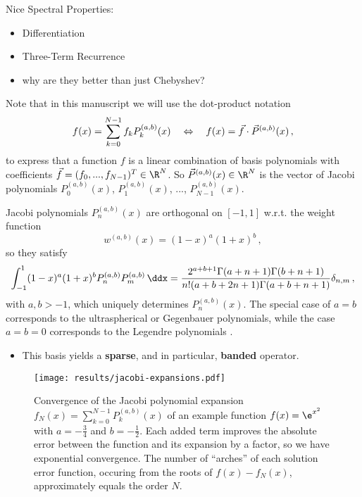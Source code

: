 Nice Spectral Properties:
\begin{itemize}
  \item Differentiation
  \item Three-Term Recurrence
  \item why are they better than just Chebyshev?
\end{itemize}

Note that in this manuscript we will use the dot-product notation
$$f(x) = \sum_{k=0}^{N-1} f_k P_k^{(a, b)}(x) \quad\Leftrightarrow\quad f(x) = \vec{f} \cdot \vec{P}^{(a, b)}(x)\,,$$
to express that a function $f$ is a linear combination of basis polynomials with coefficients $\vec{f} = (f_0, ..., f_{N-1})^T \in \R^N$.
So $\vec{P}^{(a, b)}(x) \in \R^N$ is the vector of Jacobi polynomials $P^{(a, b)}_0(x)$, $P^{(a, b)}_1(x)$, ..., $P^{(a, b)}_{N-1}(x)$.

Jacobi polynomials $P_n^{(a,b)}(x)$ are orthogonal on $[-1,1]$ w.r.t. the weight function
\begin{equation*}
  w^{(a,b)}(x)=(1-x)^a (1+x)^b\,,
\end{equation*}
so they satisfy
\begin{align}
  \int_{-1}^1(1-x)^a(1+x)^bP_n^{(a,b)}P_m^{(a,b)}\,\ddx = \frac{2^{a+b+1} \Gamma (a+n+1) \Gamma (b+n+1)}{n! (a+b+2 n+1) \Gamma (a+b+n+1)} \delta_{n,m}\,,
  \label{eq:jacobi-orthogonality-condition}
\end{align}
with $a	,b>-1$, which uniquely determines $P_n^{(a,b)}(x)$. The special case of $a=b$ corresponds to the ultraspherical or Gegenbauer polynomials, while the case $a=b=0$ corresponds to the Legendre polynomials \cite{2018-nist}.

\begin{itemize}
  \item This basis yields a \textbf{sparse}, and in particular, \textbf{banded} operator.
\end{itemize}

\begin{figure}[H]
  \centering
  \label{fig:jacobi-expansions-error}
  \texttt{[image: results/jacobi-expansions.pdf]}
  \caption[Convergence of Jacobi basis expansion]{Convergence of the Jacobi polynomial expansion $f_N(x) = \sum_{k=0}^{N-1} P_k^{(a, b)}(x)$ of an example function $f(x) = \e^{x^2}$ with $a = -\frac{3}{4}$ and $b = -\frac{1}{2}$. Each added term improves the absolute error between the function and its expansion by a factor, so we have exponential convergence. The number of ``arches'' of each solution error function, occuring from the roots of $f(x) - f_N(x)$, approximately equals the order $N$.}
\end{figure}

